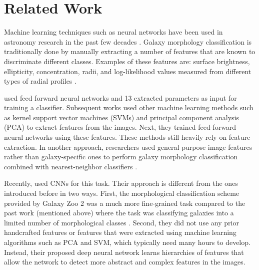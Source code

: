 \documentclass[a4paper,fleqn,usenatbib]{mnras}
\begin{document}
\section{Related Work}

Machine learning techniques such as neural networks have been used in astronomy research in the past few decades \citep[e.g., photometric redshift estimation;][]{collister2004annz, firth2003estimating}. Galaxy morphology classification is traditionally done by manually extracting a number of features that are known to discriminate different classes. Examples of these features are: surface brightness, ellipticity, concentration, radii, and log-likelihood values measured from different types of radial profiles \citep[e.g.,][]{storrie1992morphological}.

\cite{storrie1992morphological} used feed forward neural networks and 13 extracted parameters as input for training a classifier. Subsequent works used other machine learning methods such as kernel support vector machines (SVMs) \citep{tasca2009robust} and principal component analysis (PCA) \citep{naim1995automated, lahav1995galaxies, de2004machine} to extract features from the images. Next, they trained feed-forward neural networks using these features. These methods still heavily rely on feature extraction. In another approach, researchers used general purpose image features rather than galaxy-specific ones to perform galaxy morphology classification combined with nearest-neighbor classifiers \citep[e.g.,][]{kuminski2014combining}. 
 
Recently, \cite{dieleman2015rotation} used CNNs for this task. Their approach is different from the ones introduced before in two ways.  First, the morphological classification scheme provided by Galaxy Zoo 2 was a much more fine-grained task compared to the past work (mentioned above) where the task was classifying galaxies into a limited number of morphological classes \citep[except][]{kuminski2014combining}. Second, they did not use any prior handcrafted features or features that were extracted using machine learning algorithms such as PCA and SVM, which typically need many hours to develop. Instead, their proposed deep neural network learns hierarchies of features that allow the network to detect more abstract and complex features in the images. 
\end{document}
